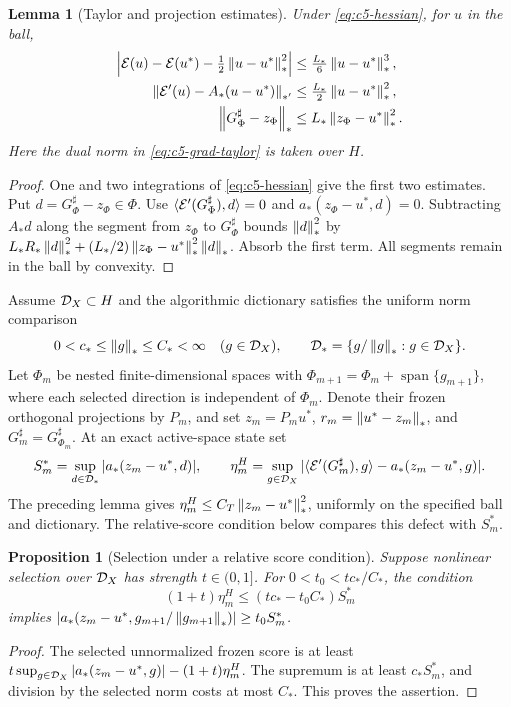 \documentclass[11pt]{article}
\newtheorem{lemma}[theorem]{Lemma}
\newtheorem{proposition}[theorem]{Proposition}
\theoremstyle{remark}
\begin{document}
\begin{lemma}[Taylor and projection estimates]
\label{lem:c5-projection}
Under \eqref{eq:c5-hessian}, for $u$ in the ball,
\begin{align}
 \left|\mathcal E(u)-\mathcal E(u^*)-\tfrac12\left\lVert u-u^*\right\rVert_*^2\right|
 &\leq\tfrac{L_*}{6}\left\lVert u-u^*\right\rVert_*^3,\label{eq:c5-taylor}\\
 \left\lVert\mathcal E'(u)-A_*(u-u^*)\right\rVert_{*'}
 &\leq\tfrac{L_*}{2}\left\lVert u-u^*\right\rVert_*^2,\label{eq:c5-grad-taylor}\\
 \left\lVert G_\Phi^\sharp-z_\Phi\right\rVert_*
 &\leq L_*\left\lVert z_\Phi-u^*\right\rVert_*^2.\label{eq:c5-proj}
\end{align}
Here the dual norm in \eqref{eq:c5-grad-taylor} is taken over $H$.
\end{lemma}
\begin{proof}
One and two integrations of \eqref{eq:c5-hessian} give the first
two estimates. Put $d=G_\Phi^\sharp-z_\Phi\in\Phi$.
Use $\langle\mathcal E'(G_\Phi^\sharp),d\rangle=0$ and
$a_*(z_\Phi-u^*,d)=0$. Subtracting $A_*d$ along the segment from
$z_\Phi$ to $G_\Phi^\sharp$ bounds
$\left\lVert d\right\rVert_*^2$ by
$L_*R_*\left\lVert d\right\rVert_*^2+(L_*/2)\left\lVert z_\Phi-u^*\right\rVert_*^2\left\lVert d\right\rVert_*$.
Absorb the first term. All segments remain in the ball by convexity.
\end{proof}

Assume $\mathcal D_X\subset H$ and the algorithmic dictionary satisfies the uniform norm comparison
\begin{equation}
 0<c_*\leq\left\lVert g\right\rVert_*\leq C_*<\infty\quad(g\in\mathcal D_X),\qquad
 \mathcal D_*=\{g/\left\lVert g\right\rVert_*:g\in\mathcal D_X\}.
 \label{eq:c5-bridge}
\end{equation}
Let $\Phi_m$ be nested finite-dimensional spaces with
$\Phi_{m+1}=\Phi_m+\operatorname{span}\{g_{m+1}\}$, where each selected
direction is independent of $\Phi_m$. Denote their frozen orthogonal
projections by $P_m$, and set $z_m=P_mu^*$,
$r_m=\left\lVert u^*-z_m\right\rVert_*$, and
$G_m^\sharp=G_{\Phi_m}^\sharp$.
At an exact active-space state set
\[
 S_m^*=\sup_{d\in\mathcal D_*}|a_*(z_m-u^*,d)|,\qquad
 \eta_m^H=\sup_{g\in\mathcal D_X}
 |\langle\mathcal E'(G_m^\sharp),g\rangle-a_*(z_m-u^*,g)|.
\]
The preceding lemma gives \(\eta_m^H\le C_T\left\lVert z_m-u^*\right\rVert_*^2\), uniformly on the specified ball and dictionary. The relative-score condition below compares this defect with \(S_m^*\).

\begin{proposition}[Selection under a relative score condition]
\label{prop:c5-transfer}
Suppose nonlinear selection over $\mathcal D_X$ has strength $t\in(0,1]$.
For $0<t_0<tc_*/C_*$, the condition
\begin{equation}
 (1+t)\eta_m^H\leq(tc_*-t_0C_*)S_m^*
 \label{eq:c5-relative}
\end{equation}
implies
$|a_*(z_m-u^*,g_{m+1}/\left\lVert g_{m+1}\right\rVert_*)|\geq t_0S_m^*$.
\end{proposition}
\begin{proof}
The selected unnormalized frozen score is at least
$t\sup_{g\in\mathcal D_X}|a_*(z_m-u^*,g)|-(1+t)\eta_m^H$.
The supremum is at least $c_*S_m^*$, and division by the selected
norm costs at most $C_*$. This proves the assertion.
\end{proof}
\end{document}
